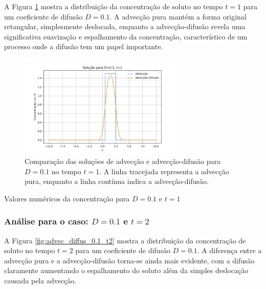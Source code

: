 A Figura \ref{fig:advec_diffus_0.1_t1} mostra a distribuição da concentração de soluto no tempo \( t = 1 \) para um coeficiente de difusão \( D = 0.1 \). A advecção pura mantém a forma original retangular, simplesmente deslocada, enquanto a advecção-difusão revela uma significativa suavização e espalhamento da concentração, característico de um processo onde a difusão tem um papel importante.

\begin{figure}[H]
    \centering
    \includegraphics[width=0.7\textwidth]{code/plot/Advec_Difus_t1_D0.1.png}
    \caption{Comparação das soluções de advecção e advecção-difusão para \( D = 0.1 \) no tempo \( t = 1 \). A linha tracejada representa a advecção pura, enquanto a linha contínua indica a advecção-difusão.}
    \label{fig:advec_diffus_0.1_t1}
\end{figure}

\begin{table}[H]
    \centering
    \caption{Valores numéricos da concentração para \( D = 0.1 \) e \( t = 1 \)}
    
\end{table}


\subsubsection{Análise para o caso: \( D = 0.1 \) e \( t = 2 \)}

A Figura \ref{fig:advec_diffus_0.1_t2} mostra a distribuição da concentração de soluto no tempo \( t = 2 \) para um coeficiente de difusão \( D = 0.1 \). A diferença entre a advecção pura e a advecção-difusão torna-se ainda mais evidente, com a difusão claramente aumentando o espalhamento do soluto além da simples deslocação causada pela advecção.

